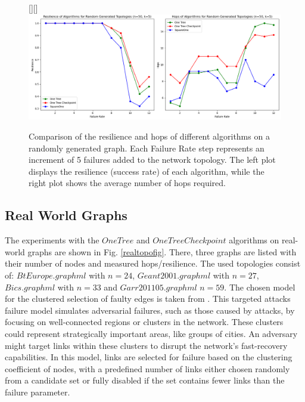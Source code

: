 \documentclass[a4paper,UKenglish,cleveref, autoref, thm-restate,dvipsnames]{lipics-v2021}
\begin{document}
\begin{figure}[h]
    \centering
    \raisebox{0pt}[\height][\depth]{\hspace*{-2cm}\includegraphics[scale=0.35]{figures/regularTopoNewAfterChange.png}}
    \caption{Comparison of the resilience and hops of different algorithms on a randomly generated graph. Each Failure Rate step represents an increment of 5 failures added to the network topology. The left plot displays the resilience (success rate) of each algorithm, while the right plot shows the average number of hops required.}

    \label{regulartopofig}
\end{figure}


\subsection{Real World Graphs}
\label{realEval}
The experiments with the $OneTree$ and $OneTreeCheckpoint$ algorithms on real-world graphs are shown in Fig. \ref{realtopofig}. There, three graphs are listed with their number of nodes and measured hops/resilience. 
The used topologies consist of: $BtEurope.graphml$ with $n=24$, $Geant2001.graphml$ with $n=27$,  $Bics.graphml$ with $n=33$ and $Garr201105.graphml$ $n=59$.
The chosen model for the clustered selection of faulty edges is taken from \cite{clusteredFailures}. 
This targeted attacks failure model simulates adversarial failures, such as those caused by attacks, by focusing on well-connected regions or clusters in the network. 
These clusters could represent strategically important areas, like groups of cities. 
An adversary might target links within these clusters to disrupt the network's fast-recovery capabilities.
In this model, links are selected for failure based on the clustering coefficient of nodes, with a predefined number of links either chosen randomly from a candidate set or fully disabled if the set contains fewer links than the failure parameter.
\end{document}
